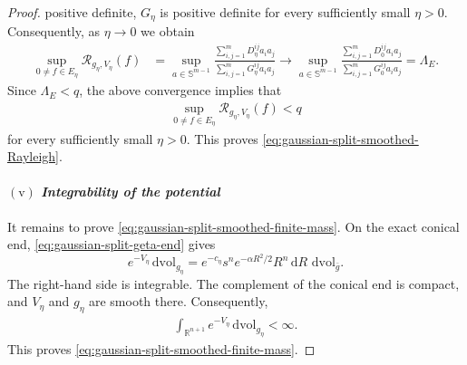 \documentclass[11pt,reqno]{amsart}
\numberwithin{equation}{section}
\theoremstyle{definition}
\theoremstyle{remark}
\def\cR {\mathcal{R}}
\newcommand{\ud}{\mathrm{d}}
\newcommand{\0}{\emptyset}
\newcommand{\bbR}{\mathbb R}
\newcommand{\bbS}{\mathbb S}
\newcommand{\dvol}{\,\mathrm{dvol}}
\begin{document}
\begin{proof}
positive definite, $G_\eta$ is positive definite for every sufficiently
small $\eta>0$. Consequently, as $\eta \to 0$ we obtain
\begin{align}
        \sup_{0\neq f\in E_\eta}
        \cR_{g_\eta,V_\eta}(f)
        &=
        \sup_{a\in \bbS^{m-1}}
        \frac{
        \sum_{i,j=1}^mD_\eta^{ij}a_ia_j
        }{
        \sum_{i,j=1}^mG_\eta^{ij}a_ia_j
        }
        \rightarrow
        \sup_{a\in \bbS^{m-1}}
        \frac{
        \sum_{i,j=1}^mD_0^{ij}a_ia_j
        }{
        \sum_{i,j=1}^mG_0^{ij}a_ia_j
        }
        =
        \Lambda_E.
\end{align}
Since $\Lambda_E<q$, the above convergence implies that
\begin{align}
        \sup_{0\neq f\in E_\eta}
        \cR_{g_\eta,V_\eta}(f)
        <
        q
\end{align}
for every sufficiently small $\eta>0$. This proves
\eqref{eq:gaussian-split-smoothed-Rayleigh}.

\paragraph{$\mathrm{(v)}$ \textit{Integrability of the potential}} It remains to prove \eqref{eq:gaussian-split-smoothed-finite-mass}. On the exact conical end, \eqref{eq:gaussian-split-geta-end} gives
\[
        e^{-V_\eta}\dvol_{g_\eta}
        =
        e^{-c_\eta}s^n
        e^{-\alpha R^2/2}R^n
        \,\ud R\,\dvol_{\bar g}.
\]
The right-hand side is integrable. The complement of the conical end is compact, and $V_\eta$ and $g_\eta$ are smooth there. Consequently,
\begin{align}
        \int_{\bbR^{n+1}}
        e^{-V_\eta}\dvol_{g_\eta}
        <
        \infty.
\end{align}
This proves \eqref{eq:gaussian-split-smoothed-finite-mass}.
\end{proof}
\end{document}
